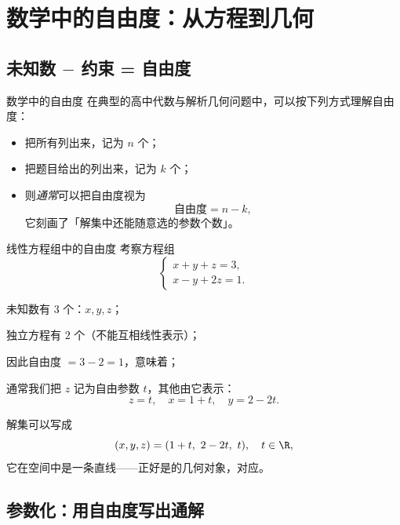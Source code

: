 \documentclass[a4paper,11pt]{ctexart}
\begin{document}
\clearpage
\section{数学中的自由度：从方程到几何}

\subsection{未知数 $-$ 约束 = 自由度}

\begin{definitionbox}{数学中的自由度}
  在典型的高中代数与解析几何问题中，可以按下列方式理解自由度：
  \begin{itemize}
    \item 把所有列出来，记为 $n$ 个；
    \item 把题目给出的列出来，记为 $k$ 个；
    \item 则\emph{通常}可以把自由度视为
          \[
            \text{自由度} = n - k,
          \]
          它刻画了「解集中还能随意选的参数个数」。
  \end{itemize}
\end{definitionbox}

\begin{examplebox}{线性方程组中的自由度}
  考察方程组
  \[
    \begin{cases}
      x + y + z = 3,\\[0.3em]
      x - y + 2z = 1.
    \end{cases}
  \]
  \begin{focuspoints}
    \item 未知数有 $3$ 个：$x,y,z$；
    \item 独立方程有 $2$ 个（不能互相线性表示）；
    \item 因此自由度 $=3-2=1$，意味着；
    \item 通常我们把 $z$ 记为自由参数 $t$，其他由它表示：
          \[
            z = t,\quad x = 1 + t,\quad y = 2 - 2t.
          \]
  \end{focuspoints}
  解集可以写成
  \[
    (x,y,z) = (1+t,\ 2-2t,\ t),\quad t\in\R,
  \]
  它在空间中是一条直线——正好是的几何对象，对应。
\end{examplebox}

\subsection{参数化：用自由度写出通解}
\end{document}
